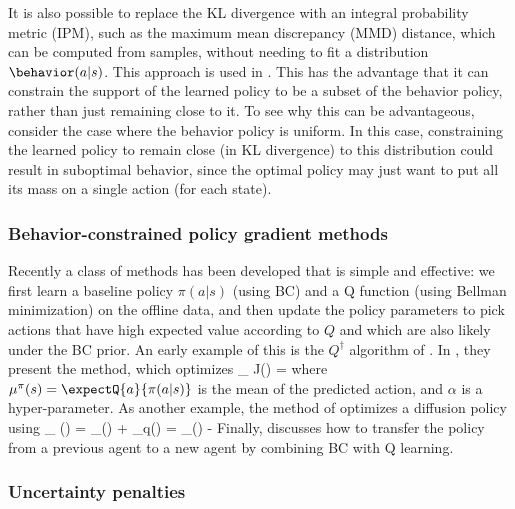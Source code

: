 It is also possible to replace the KL divergence
with an integral probability metric (IPM),
such as the maximum mean discrepancy (MMD) distance,
which can be computed from samples,
without needing to fit a distribution $\behavior(a|s)$.
This approach is used in 
\citep{Kumar2019off}.
This has the advantage that it can constrain the support of the learned
policy to be a subset of the behavior policy,
rather than just remaining close to it.
To see why this can be advantageous, consider the case where
the behavior policy is uniform.
In this case, constraining the learned policy to remain close (in KL divergence)
to this distribution could result in suboptimal behavior,
since the optimal policy may just want to put all its mass on a single action
(for each state).

\subsubsection{Behavior-constrained policy gradient methods}

Recently a class of methods has been developed that is simple and effective:
we first learn a baseline policy $\pi(a|s)$ (using BC) and a Q function
(using Bellman minimization) on the offline data,
and then update the policy parameters to pick actions that have high expected
value according to $Q$ and which are also likely under the BC prior.
An early example of this is the $Q^{\dagger}$ algorithm
of \citep{Fujimoto2019batch}.
In  \citep{Fujimoto2021}, they present
 the  method,
which optimizes
\be
\max_{\pi} J(\pi) = 
\ee
where $\mu^{\pi}(s) = \expectQ{a}{\pi(a|s)}$ is the mean of
the predicted action, and $\alpha$ is a hyper-parameter.
As another example,
the  method of \citep{Wang2023DQL}
optimizes a diffusion policy using
\be
\min_{\pi} \loss(\pi)
= \loss_{}(\pi) + \loss_{q}(\pi)
= \loss_{}(\pi) 
- \alpha {}
\ee
Finally, \citep{Agarwal2022} discusses how to transfer
the policy from a previous agent to a new agent
by combining BC with Q learning.

\subsubsection{Uncertainty penalties}
\label{sec:offlineUncertainty}

